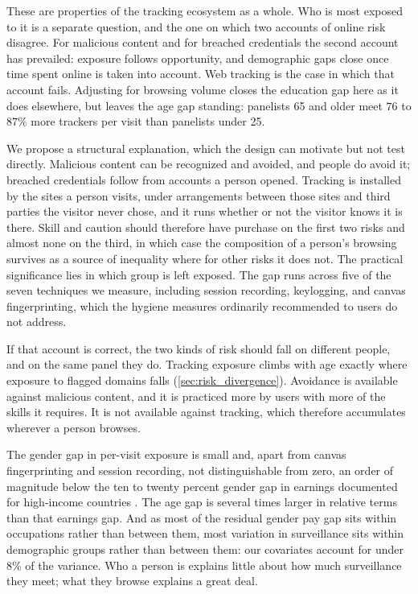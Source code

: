 \documentclass[12pt, letterpaper]{article}
\begin{document}
These are properties of the tracking ecosystem as a whole. Who is most exposed to it is a separate question, and the one on which two accounts of online risk disagree. For malicious content and for breached credentials the second account has prevailed: exposure follows opportunity, and demographic gaps close once time spent online is taken into account. Web tracking is the case in which that account fails. Adjusting for browsing volume closes the education gap here as it does elsewhere, but leaves the age gap standing: panelists 65 and older meet $76$ to $87\%$ more trackers per visit than panelists under 25.
 
We propose a structural explanation, which the design can motivate but not test directly. Malicious content can be recognized and avoided, and people do avoid it; breached credentials follow from accounts a person opened. Tracking is installed by the sites a person visits, under arrangements between those sites and third parties the visitor never chose, and it runs whether or not the visitor knows it is there. Skill and caution should therefore have purchase on the first two risks and almost none on the third, in which case the composition of a person's browsing survives as a source of inequality where for other risks it does not. The practical significance lies in which group is left exposed. The gap runs across five of the seven techniques we measure, including session recording, keylogging, and canvas fingerprinting, which the hygiene measures ordinarily recommended to users do not address.
 
If that account is correct, the two kinds of risk should fall on different people, and on the same panel they do. Tracking exposure climbs with age exactly where exposure to flagged domains falls (\cref{sec:risk_divergence}). Avoidance is available against malicious content, and it is practiced more by users with more of the skills it requires. It is not available against tracking, which therefore accumulates wherever a person browses.
 
The gender gap in per-visit exposure is small and, apart from canvas fingerprinting and session recording, not distinguishable from zero, an order of magnitude below the ten to twenty percent gender gap in earnings documented for high-income countries \citep{goldin2014grand}.
The age gap is several times larger in relative terms than that earnings gap. And as most of the residual gender pay gap sits within occupations rather than between them, most variation in surveillance sits within demographic groups rather than between them: our covariates account for under $8\%$ of the variance. Who a person is explains little about how much surveillance they meet; what they browse explains a great deal.
 
\end{document}
